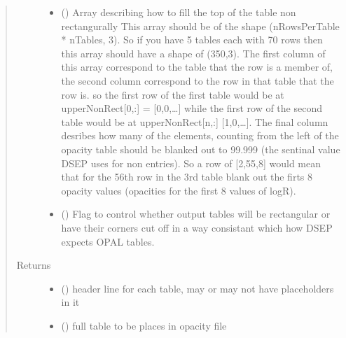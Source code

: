 \documentclass[letterpaper,10pt,english]{sphinxmanual}
\begin{document}
\begin{fulllineitems}
\begin{quote}
\begin{description}
\begin{itemize}
\item {} 
\sphinxAtStartPar
{} (\sphinxstyleliteralemphasis{\sphinxupquote{, }}) \textendash{} Array describing how to fill the top of the table non rectangurally
This array should be of the shape (nRowsPerTable * nTables, 3). So
if you have 5 tables each with 70 rows then this array should have
a shape of (350,3). The first column of this array correspond to
the table that the row is a member of, the second column correspond
to the row in that table that the row is. so the first row of the
first table would be at upperNonRect{[}0,:{]} = {[}0,0,…{]} while the
first row of the second table would be at upperNonRect{[}n,:{]}
{[}1,0,…{]}. The final column desribes how many of the elements,
counting from the left of the opacity table should be blanked out
to 99.999 (the sentinal value DSEP uses for non entries). So a row
of {[}2,55,8{]} would mean that for the 56th row in the 3rd table blank
out the firts 8 opacity values (opacities for the first 8 values of
logR).

\item {} 
\sphinxAtStartPar
{} (\sphinxstyleliteralemphasis{\sphinxupquote{, }}) \textendash{} Flag to control whether output tables will be rectangular or have
their corners cut off in a way consistant which how DSEP expects
OPAL tables.

\end{itemize}

\item[{Returns}] \leavevmode
\sphinxAtStartPar
\begin{itemize}
\item {} 
\sphinxAtStartPar
{} () \textendash{} header line for each table, may or may not have placeholders in it

\item {} 
\sphinxAtStartPar
{} () \textendash{} full table to be places in opacity file

\end{itemize}


\end{description}\end{quote}

\end{fulllineitems}
\end{document}
